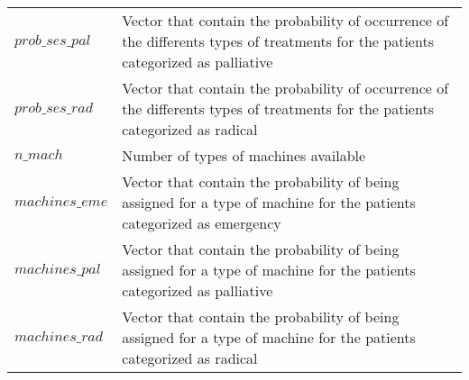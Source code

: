 \begin{tabular}{ll}
 $prob\_ses\_pal$ & Vector that contain the probability of occurrence of the differents types of treatments for the patients categorized as palliative\\
 $prob\_ses\_rad$ & Vector that contain the probability of occurrence of the differents types of treatments for the patients categorized as radical\\
 $n\_mach$ & Number of types of machines available\\
 $machines\_eme$ & Vector that contain the probability of being assigned for a type of machine for the patients categorized as emergency\\
 $machines\_pal$ & Vector that contain the probability of being assigned for a type of machine for the patients categorized as palliative\\
 $machines\_rad$ & Vector that contain the probability of being assigned for a type of machine for the patients categorized as radical\\
\end{tabular}
